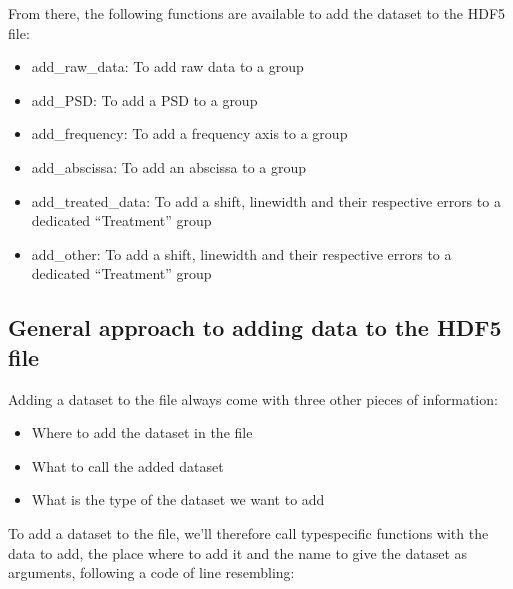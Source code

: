 \documentclass[letterpaper,10pt,english]{sphinxmanual}
\begin{document}
\sphinxAtStartPar
From there, the following functions are available to add the dataset to the HDF5 file:
\begin{itemize}
\item {} 
\sphinxAtStartPar
add\_raw\_data: To add raw data to a group

\item {} 
\sphinxAtStartPar
add\_PSD: To add a PSD to a group

\item {} 
\sphinxAtStartPar
add\_frequency: To add a frequency axis to a group

\item {} 
\sphinxAtStartPar
add\_abscissa: To add an abscissa to a group

\item {} 
\sphinxAtStartPar
add\_treated\_data: To add a shift, linewidth and their respective errors to a dedicated “Treatment” group

\item {} 
\sphinxAtStartPar
add\_other: To add a shift, linewidth and their respective errors to a dedicated “Treatment” group

\end{itemize}


\subsection{General approach to adding data to the HDF5 file}
\label{\detokenize{source/hdf5_bls_package:general-approach-to-adding-data-to-the-hdf5-file}}
\sphinxAtStartPar
Adding a dataset to the file always come with three other pieces of information:
\begin{itemize}
\item {} 
\sphinxAtStartPar
Where to add the dataset in the file

\item {} 
\sphinxAtStartPar
What to call the added dataset

\item {} 
\sphinxAtStartPar
What is the type of the dataset we want to add

\end{itemize}

\sphinxAtStartPar
To add a dataset to the file, we’ll therefore call type\sphinxhyphen{}specific functions with the data to add, the place where to add it and the name to give the dataset as arguments, following a code of line resembling:

\begin{sphinxVerbatim}[commandchars=\\\{\}]
  
                   
                   
\end{sphinxVerbatim}
\end{document}
